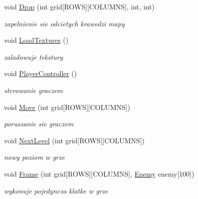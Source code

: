 \begin{DoxyCompactItemize}
\item 
void \mbox{\hyperlink{class_xionix_af746b9702ca0143ec66009836509c683}{Drop}} (int grid\mbox{[}R\+O\+WS\mbox{]}\mbox{[}C\+O\+L\+U\+M\+NS\mbox{]}, int, int)
\begin{DoxyCompactList}\small\item\em zapelnienie sie odcietych krawedzi mapy \end{DoxyCompactList}\item 
\mbox{\label{class_xionix_aeb43399427861b9476e779b46ebee624}} 
void \mbox{\hyperlink{class_xionix_aeb43399427861b9476e779b46ebee624}{Load\+Textures}} ()
\begin{DoxyCompactList}\small\item\em zaladowuje tekstury \end{DoxyCompactList}\item 
\mbox{\label{class_xionix_a0277000864442f9c8503063764cd0d57}} 
void \mbox{\hyperlink{class_xionix_a0277000864442f9c8503063764cd0d57}{Player\+Controller}} ()
\begin{DoxyCompactList}\small\item\em sterowanie graczem \end{DoxyCompactList}\item 
void \mbox{\hyperlink{class_xionix_a093234e743648b902559789b8ee0d035}{Move}} (int grid\mbox{[}R\+O\+WS\mbox{]}\mbox{[}C\+O\+L\+U\+M\+NS\mbox{]})
\begin{DoxyCompactList}\small\item\em poruszanie sie graczem \end{DoxyCompactList}\item 
void \mbox{\hyperlink{class_xionix_ae1994086daa545ada9c595a236a987ce}{Next\+Level}} (int grid\mbox{[}R\+O\+WS\mbox{]}\mbox{[}C\+O\+L\+U\+M\+NS\mbox{]})
\begin{DoxyCompactList}\small\item\em nowy poziom w grze \end{DoxyCompactList}\item 
void \mbox{\hyperlink{class_xionix_a523cb291105ce5803cf411cf88bac652}{Frame}} (int grid\mbox{[}R\+O\+WS\mbox{]}\mbox{[}C\+O\+L\+U\+M\+NS\mbox{]}, \mbox{\hyperlink{struct_xionix_1_1_enemy}{Enemy}} enemy\mbox{[}100\mbox{]})
\begin{DoxyCompactList}\small\item\em wykonuje pojedyncza klatke w grze \end{DoxyCompactList}\end{DoxyCompactItemize}
